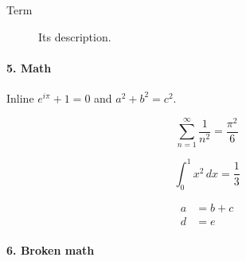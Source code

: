 \begin{description}
  \item[Term] Its description.
\end{description}

\paragraph{5. Math}

Inline $e^{i\pi} + 1 = 0$ and \(a^2 + b^2 = c^2\).

\[ \sum_{n=1}^\infty \frac{1}{n^2} = \frac{\pi^2}{6} \]

\begin{equation}
  \int_0^1 x^2\,dx = \frac{1}{3} \label{eq:integral}
\end{equation}

\begin{align*}
  a &= b + c \\
  d &= e
\end{align*}

\paragraph{6. Broken math}

